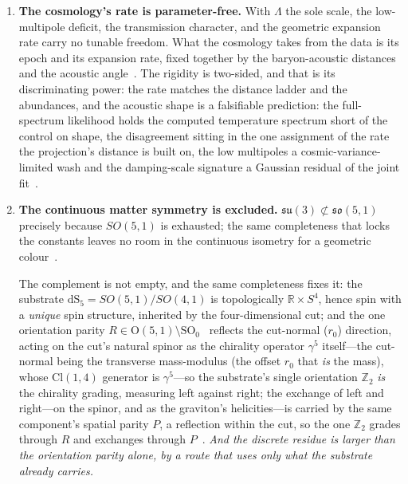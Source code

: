 \documentclass[11pt,a4paper]{article}
\theoremstyle{definition}
\begin{document}
\begin{enumerate}
\emph{And the count that decides this reading has been run.} The sector's
non-symmetric residue is one and is already counted: maximal symmetry leaves a
one-dimensional quotient which \emph{is} the scale, so no constant it fails to
reach remains, and the matter sector spends none of the geometric
budget. \emph{What the count leaves is not a constant but the matter's own content}---the composition the corpus carries as empirical, exactly as flat $\Lambda$CDM carries $\eta$. The source facts are each established and cited, the sector's
free-data count of zero is carried by that count, and the theory's remaining
free datum is the matter's.
\item \textbf{The cosmology's rate is parameter-free.} With $\Lambda$ the sole
scale, the low-multipole deficit, the transmission character, and the
geometric expansion rate carry no tunable freedom. What the cosmology takes from the data is its epoch and its expansion rate, fixed together by the baryon-acoustic distances and the acoustic angle~\cite{JanzenCRcosmology}. The rigidity is two-sided, and that is its
discriminating power: the rate matches the distance ladder and the abundances,
and the acoustic shape is a falsifiable prediction: the full-spectrum likelihood
holds the computed temperature spectrum short of the control on shape, the
disagreement sitting in the one assignment of the rate the projection's distance is
built on, the low multipoles a cosmic-variance-limited wash and the damping-scale
signature a Gaussian residual of the joint fit~\cite{JanzenCRcosmology}.
\item \textbf{The continuous matter symmetry is excluded.}
$\mathfrak{su}(3)\not\subset\mathfrak{so}(5,1)$ precisely because $SO(5,1)$
is exhausted; the same completeness that locks the constants leaves no room
in the continuous isometry for a geometric colour~\cite{JanzenBoundary}.


The complement is not empty, and the same completeness fixes it: the
substrate $\mathrm{dS}_5=SO(5,1)/SO(4,1)$ is topologically $\mathbb{R}\times
S^4$, hence spin with a \emph{unique} spin structure, inherited by the
four-dimensional cut; and the one orientation parity
$R\in\mathrm{O}(5,1)\setminus\mathrm{SO}_0$~\cite{JanzenAlgebroid} reflects the
cut-normal ($r_0$) direction, acting on the cut's natural spinor as the chirality operator $\gamma^5$
itself---the cut-normal being the transverse mass-modulus (the offset $r_0$
that \emph{is} the mass), whose $\mathrm{Cl}(1,4)$ generator is $\gamma^5$---so
the substrate's single orientation $\mathbb{Z}_2$ \emph{is} the chirality
grading, measuring left against right; the exchange of left and right---on the spinor, and as the graviton's
helicities---is carried by the same component's spatial parity $P$, a reflection within the cut, so the one
$\mathbb{Z}_2$ grades through $R$ and exchanges through $P$~\cite{JanzenAlgebroid,JanzenMatter}. \emph{And the discrete residue is larger than the orientation parity alone, by a route that uses only what
the substrate already carries.} 


\end{enumerate}
\end{document}
